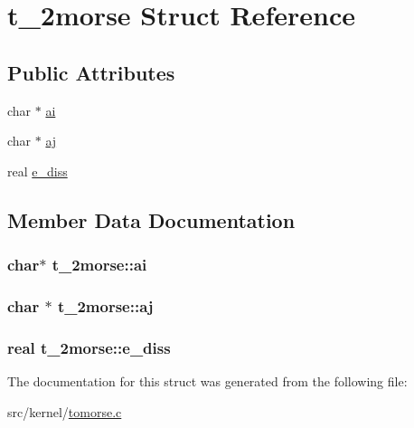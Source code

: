 \hypertarget{structt__2morse}{\section{t\-\_\-2morse \-Struct \-Reference}
\label{structt__2morse}
}
\subsection*{\-Public \-Attributes}
\begin{DoxyCompactItemize}
\item 
char $\ast$ \hyperlink{structt__2morse_adb568c9c92e38e1f4a8ab02d793dcf12}{ai}
\item 
char $\ast$ \hyperlink{structt__2morse_a822e7d83fa60004f2e64a2f9a0b81b03}{aj}
\item 
real \hyperlink{structt__2morse_afaff407d71e5fc5e495a6b281ce58964}{e\-\_\-diss}
\end{DoxyCompactItemize}


\subsection{\-Member \-Data \-Documentation}
\hypertarget{structt__2morse_adb568c9c92e38e1f4a8ab02d793dcf12}{
\subsubsection[{ai}]{\setlength{\rightskip}{0pt plus 5cm}char$\ast$ {\bf t\-\_\-2morse\-::ai}}}\label{structt__2morse_adb568c9c92e38e1f4a8ab02d793dcf12}
\hypertarget{structt__2morse_a822e7d83fa60004f2e64a2f9a0b81b03}{
\subsubsection[{aj}]{\setlength{\rightskip}{0pt plus 5cm}char $\ast$ {\bf t\-\_\-2morse\-::aj}}}\label{structt__2morse_a822e7d83fa60004f2e64a2f9a0b81b03}
\hypertarget{structt__2morse_afaff407d71e5fc5e495a6b281ce58964}{
\subsubsection[{e\-\_\-diss}]{\setlength{\rightskip}{0pt plus 5cm}real {\bf t\-\_\-2morse\-::e\-\_\-diss}}}\label{structt__2morse_afaff407d71e5fc5e495a6b281ce58964}


\-The documentation for this struct was generated from the following file\-:\begin{DoxyCompactItemize}
\item 
src/kernel/\hyperlink{tomorse_8c}{tomorse.\-c}\end{DoxyCompactItemize}
